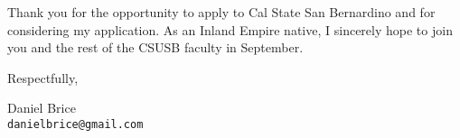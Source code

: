 \documentclass[11pt]{article}
\begin{document}
Thank you for the opportunity to apply to Cal State San Bernardino
and for considering my application.
As an Inland Empire native,
I sincerely hope to join you and the rest of the CSUSB faculty
in September.

\vfill

Respectfully,

\vfill

Daniel Brice\\
\texttt{danielbrice@gmail.com}

\label{page:last}
\end{document}
